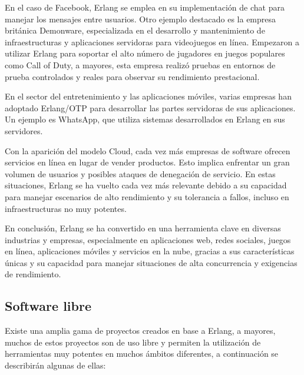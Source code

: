 En el caso de Facebook, Erlang se emplea en su implementación de chat para manejar los mensajes entre usuarios. Otro ejemplo destacado es la empresa británica Demonware, especializada en el desarrollo y mantenimiento de infraestructuras y aplicaciones servidoras para videojuegos en línea. Empezaron a utilizar Erlang para soportar el alto número de jugadores en juegos populares como Call of Duty, a mayores, esta empresa realizó pruebas en entornos de prueba controlados y reales para observar su rendimiento prestacional.

En el sector del entretenimiento y las aplicaciones móviles, varias empresas han adoptado Erlang/OTP para desarrollar las partes servidoras de sus aplicaciones. Un ejemplo es WhatsApp, que utiliza sistemas desarrollados en Erlang en sus servidores.

Con la aparición del modelo Cloud, cada vez más empresas de software ofrecen servicios en línea en lugar de vender productos. Esto implica enfrentar un gran volumen de usuarios y posibles ataques de denegación de servicio. En estas situaciones, Erlang se ha vuelto cada vez más relevante debido a su capacidad para manejar escenarios de alto rendimiento y su tolerancia a fallos, incluso en infraestructuras no muy potentes.

En conclusión, Erlang se ha convertido en una herramienta clave en diversas industrias y empresas, especialmente en aplicaciones web, redes sociales, juegos en línea, aplicaciones móviles y servicios en la nube, gracias a sus características únicas y su capacidad para manejar situaciones de alta concurrencia y exigencias de rendimiento.

\subsection{Software libre}

Existe una amplia gama de proyectos creados en base a Erlang, a mayores, muchos de estos proyectos son de uso libre y permiten la utilización de herramientas muy potentes en muchos ámbitos diferentes, a continuación se describirán algunas de ellas:

